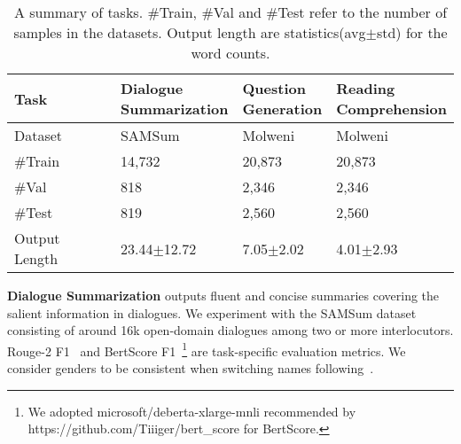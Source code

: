 \begin{table}[h]
	\scriptsize
	\centering
	\begin{tabular}{l|lll}
		\toprule[1pt]
		\textbf{Task} & \makecell[c]{\textbf{Dialogue}\\\textbf{Summarization}}& \makecell[c]{\textbf{Question}\\\textbf{Generation}}
		& \makecell[c]{\textbf{Reading}\\\textbf{Comprehension}} \\
		\hline
		Dataset & SAMSum & Molweni & Molweni \\
		\#Train & 14,732 & 20,873 & 20,873 \\
		\#Val & 818& 2,346 & 2,346 \\
		\#Test & 819 & 2,560 & 2,560\\
		Output Length & 23.44$\pm$12.72 & 7.05$\pm$2.02 &4.01$\pm$2.93 \\
		\bottomrule[1pt]
	\end{tabular}
	
	
	
	\caption{A summary of tasks. \#Train, \#Val and \#Test refer to the number of samples in the datasets. Output length are statistics(avg$\pm$std) for the word counts.}%
	\label{tab:taskdata}
\end{table}

\textbf{Dialogue Summarization} outputs fluent and concise summaries covering the salient information in dialogues. We experiment with the SAMSum dataset~\cite{gliwa2019samsum} consisting of around 16k open-domain dialogues among two or more interlocutors. Rouge-2 F1~\cite{lin2004rouge} and BertScore F1~\cite{zhang2019bertscore}\footnote{We adopted microsoft/deberta-xlarge-mnli recommended by {https://github.com/Tiiiger/bert\_score} for BertScore.} are task-specific evaluation metrics. We consider genders to be consistent when switching names following~\citet{khalifa2021bag}. 

